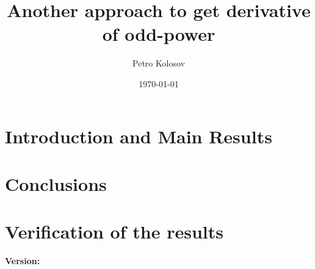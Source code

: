 \documentclass[12pt,letterpaper,oneside,reqno]{amsart}
\title[Another approach to get derivative of odd-power]
{Another approach to get derivative of odd-power}
\author[Petro Kolosov]{Petro Kolosov}
\date{\today}
\begin{document}
    \begin{abstract}
        
    \end{abstract}

    \maketitle

    \tableofcontents


    \section{Introduction and Main Results} \label{sec:introduction}
    


    \section{Conclusions}\label{sec:conclusions}
    


    \section{Verification of the results}\label{sec:verification-of-the-results}
    

    
    
    \noindent \textbf{Version:} 
\end{document}
